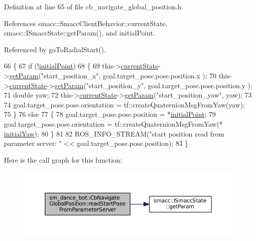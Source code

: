 Definition at line 65 of file cb\+\_\+navigate\+\_\+global\+\_\+position.\+h.



References smacc\+::\+Smacc\+Client\+Behavior\+::current\+State, smacc\+::\+I\+Smacc\+State\+::get\+Param(), and initial\+Point.



Referenced by go\+To\+Radial\+Start().


\begin{DoxyCode}
66   \{
67     \textcolor{keywordflow}{if} (!\hyperlink{classsm__dance__bot_1_1CbNavigateGlobalPosition_a9b81342ca5492d3b9724c488c1f39f4f}{initialPoint})
68     \{
69       this->\hyperlink{classsmacc_1_1SmaccClientBehavior_af76fc9b877542ed5caf033f820c107d0}{currentState}->\hyperlink{classsmacc_1_1ISmaccState_abbb3a24b912c6e8de28f7b86123b6357}{getParam}(\textcolor{stringliteral}{"start\_position\_x"}, goal.target\_pose.pose.position.x
      );
70       this->\hyperlink{classsmacc_1_1SmaccClientBehavior_af76fc9b877542ed5caf033f820c107d0}{currentState}->\hyperlink{classsmacc_1_1ISmaccState_abbb3a24b912c6e8de28f7b86123b6357}{getParam}(\textcolor{stringliteral}{"start\_position\_y"}, goal.target\_pose.pose.position.y
      );
71       \textcolor{keywordtype}{double} yaw;
72       this->\hyperlink{classsmacc_1_1SmaccClientBehavior_af76fc9b877542ed5caf033f820c107d0}{currentState}->\hyperlink{classsmacc_1_1ISmaccState_abbb3a24b912c6e8de28f7b86123b6357}{getParam}(\textcolor{stringliteral}{"start\_position\_yaw"}, yaw);
73 
74       goal.target\_pose.pose.orientation = tf::createQuaternionMsgFromYaw(yaw);
75     \}
76     \textcolor{keywordflow}{else}
77     \{
78       goal.target\_pose.pose.position = *\hyperlink{classsm__dance__bot_1_1CbNavigateGlobalPosition_a9b81342ca5492d3b9724c488c1f39f4f}{initialPoint};
79       goal.target\_pose.pose.orientation = tf::createQuaternionMsgFromYaw(*
      \hyperlink{classsm__dance__bot_1_1CbNavigateGlobalPosition_ad7ac13ee1b0f1a5dfdd47639930ab34c}{initialYaw});
80     \}
81 
82     ROS\_INFO\_STREAM(\textcolor{stringliteral}{"start position read from parameter server: "} << goal.target\_pose.pose.position);
83   \}
\end{DoxyCode}


Here is the call graph for this function\+:
\nopagebreak
\begin{figure}[H]
\begin{center}
\leavevmode
\includegraphics[width=350pt]{classsm__dance__bot_1_1CbNavigateGlobalPosition_aa081de6b798e53e4fd0a4b86e55635b5_cgraph}
\end{center}
\end{figure}




